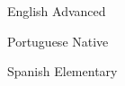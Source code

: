 

\begin{cvskills}

  \cvskill
    {English} %
    {Advanced} %

  \cvskill
    {Portuguese} %
    {Native} %

  \cvskill
    {Spanish} %
    {Elementary} %

\end{cvskills}